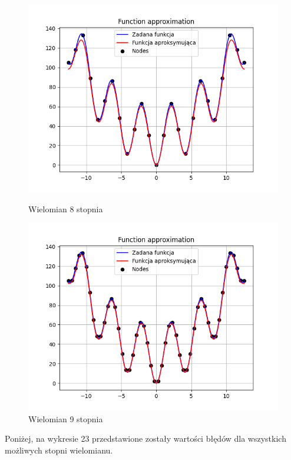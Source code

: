 \documentclass{article}
\begin{document}
\begin{figure}[H]
\begin{minipage}[b]{0.49\textwidth}
    \begin{minipage}[b]{\textwidth}
      \includegraphics[width=\textwidth]{img21.png}
      \caption{Wielomian 8 stopnia}
    \end{minipage}
    \vspace*{\fill}
    \begin{minipage}[b]{\textwidth}
      \includegraphics[width=\textwidth]{img22.png}
      \caption{Wielomian 9 stopnia}
    \end{minipage}
  \end{minipage}
\end{figure}

\noindent
Poniżej, na wykresie 23 przedstawione zostały wartości błędów dla wszystkich możliwych stopni wielomianu.
\end{document}
